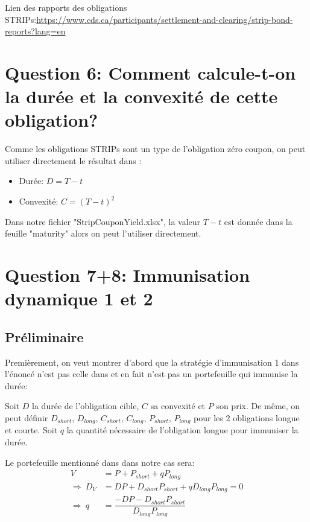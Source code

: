 \documentclass[letterpaper,11pt]{article}
\newcommand{\?}{\stackrel{?}{=}}
\begin{document}
Lien des rapports des obligations STRIPs:\url{https://www.cds.ca/participants/settlement-and-clearing/strip-bond-reports?lang=en}


\newpage
\section*{Question 6: Comment calcule-t-on la durée et la convexité de cette obligation?}
Comme les obligations STRIPs sont un type de l'obligation zéro coupon, on peut utiliser directement le résultat dans \cite{book}:
\begin{itemize}
    \item Durée: $D=T-t$
    \item Convexité: $C= (T-t)^2$
\end{itemize}

Dans notre fichier "StripCouponYield.xlsx", la valeur $T-t$ est donnée dans la feuille "maturity" alors on peut l'utiliser directement.

\newpage
\section*{Question 7+8: Immunisation dynamique 1 et 2}
\subsection*{Préliminaire}
Premièrement, on veut montrer d'abord que la stratégie d'immunisation 1 dans l'énoncé n'est pas celle dans \cite{book} et en fait n'est pas un portefeuille qui immunise la durée:

Soit $D$ la durée de l'obligation cible, $C$ sa convexité et $P$ son prix. De même, on peut définir $D_{short}$, $D_{long}$, $C_{short}$, $C_{long}$, $P_{short}$, $P_{long}$ pour les 2 obligations longue et courte. Soit $q$ la quantité nécessaire de l'obligation longue pour immuniser la durée.

Le portefeuille mentionné dans \cite{book} dans notre cas sera:
\begin{equation*}
    \begin{aligned}
        V &=P+P_{short}+qP_{long} \\
      \Rightarrow{} \ D_V&=DP+D_{short}P_{short}+qD_{long} P_{long} =0 \\
      \Rightarrow{} \ q&= \dfrac{-DP-D_{short}P_{short}}{D_{long} P_{long}} \\
    \end{aligned}
\end{equation*}
\end{document}
